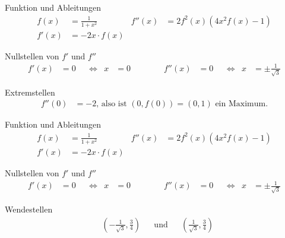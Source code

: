 \begin{taskframes}{3.105}
\begin{taskframe}
    \begin{mathbox}{Funktion und Ableitungen}
        \begin{align*}
            f(x) &= \frac{1}{1+x^2} & f''(x) &= 2 f^2(x) (4x^2 f(x) - 1) \\
            f'(x) &= -2x \cdot f(x)
        \end{align*}
    \end{mathbox}
    \begin{mathbox}{Nullstellen von $f'$ und $f''$}
        \begin{align*}
            f'(x) &= 0 & &\Leftrightarrow & x &= 0 & && &&
            f''(x) &= 0 & &\Leftrightarrow & x &= \pm\frac{1}{\sqrt{3}}
        \end{align*}
    \end{mathbox}
    \begin{mathbox}{Extremstellen}
        \begin{align*}
            f''(0) &= -2 \text{, also ist $(0,f(0)) = (0,1)$ ein Maximum.}
        \end{align*}
    \end{mathbox}
\end{taskframe}

\begin{taskframe}
    \begin{mathbox}{Funktion und Ableitungen}
        \begin{align*}
            f(x) &= \frac{1}{1+x^2} & f''(x) &= 2 f^2(x) (4x^2 f(x) - 1) \\
            f'(x) &= -2x \cdot f(x)
        \end{align*}
    \end{mathbox}
    \begin{mathbox}{Nullstellen von $f'$ und $f''$}
        \begin{align*}
            f'(x) &= 0 & &\Leftrightarrow & x &= 0 & && &&
            f''(x) &= 0 & &\Leftrightarrow & x &= \pm\frac{1}{\sqrt{3}}
        \end{align*}
    \end{mathbox}
    \begin{mathbox}{Wendestellen}
        \begin{align*}
            &(-\frac{1}{\sqrt{3}}, \frac{3}{4}) & &\text{und} & &(\frac{1}{\sqrt{3}}, \frac{3}{4})
        \end{align*}
    \end{mathbox}
\end{taskframe}

\end{taskframes}
